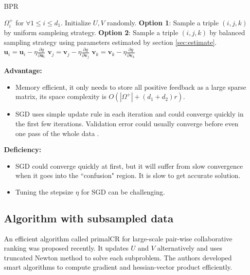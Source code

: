 \documentclass[conference]{IEEEtran}
\numberwithin{equation}{section}
\newtheorem{sampling strategy}{Sampling Strategy}
\begin{document}
\begin{algorithm}[H]
   \caption{BPR}
   \label{alg:bpr}
\begin{algorithmic}
    $\Omega_i^+$ for $\forall 1 \leq i \leq d_1$.
   \STATE Initialize $U,V$ randomly.
   \REPEAT
   \STATE \textbf{Option 1}: Sample a triple $(i,j,k)$ by uniform sampleing strategy.
   \STATE \textbf{Option 2}: Sample a triple $(i,j,k)$ by balanced sampling strategy using parameters estimated by section \ref{sec:estimate}.
   \STATE $\displaystyle \bm{u}_i = \bm{u}_i - \eta \frac{\partial g}{ \partial \bm{u}_i }$
   \STATE $\displaystyle \bm{v}_j = \bm{v}_j - \eta \frac{\partial g}{ \partial \bm{v}_j }$
   \STATE $\displaystyle \bm{v}_k = \bm{v}_k - \eta \frac{\partial g}{ \partial \bm{v}_k }$
\end{algorithmic}
\end{algorithm}

\textbf{Advantage: } 

\begin{itemize}
    \item Memory efficient, it only needs to store all positive feedback as a large sparse matrix, its space complexity is $O(|\Omega^+| + (d_1 + d_2)r)$. 
    \item SGD uses simple update rule in each iteration and could converge quickly in the first few iterations. Validation error could usually converge before even one pass of the whole data \cite{bpr}.
\end{itemize}

\textbf{Deficiency:}

\begin{itemize}
    \item SGD could converge quickly at first, but it will suffer from slow convergence when it goes into the ``confusion" region. It is slow to get accurate solution.
    \item Tuning the stepsize $\eta$ for SGD can be challenging.
\end{itemize}

\subsection{Algorithm with subsampled data}

An efficient algorithm called \textsf{primalCR} \cite{crlinear} for large-scale pair-wise collaborative ranking was proposed recently. It updates $U$ and $V$ alternatively and uses truncated Newton method to solve each subproblem. The authors developed smart algorithms to compute gradient and hessian-vector product efficiently.
\end{document}
